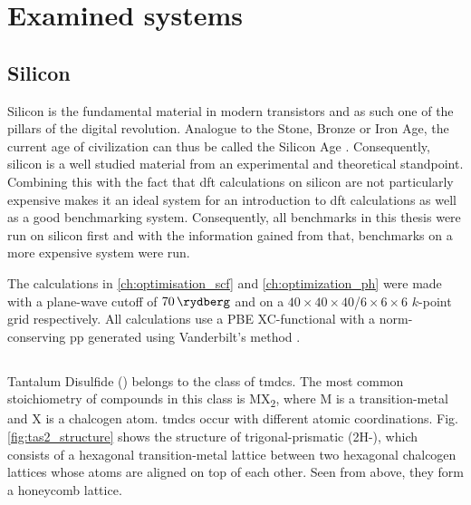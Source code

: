 \documentclass[main.tex]{subfiles}
\begin{document}
\chapter{Examined systems}\label{ch:examined_systems}

\section{Silicon}\label{sec:systems_silicon}

Silicon is the fundamental material in modern transistors and as such one of the pillars of the digital revolution.
Analogue to the Stone, Bronze or Iron Age, the current age of civilization can thus be called the Silicon Age \cite{chabal_fundamental_2001}.
Consequently, silicon is a well studied material from an experimental and theoretical standpoint.
Combining this with the fact that \acrshort{dft} calculations on silicon are not particularly expensive makes it an ideal system for an introduction to \acrshort{dft} calculations as well as a good benchmarking system.
Consequently, all benchmarks in this thesis were run on silicon first and with the information gained from that, benchmarks on a more expensive system were run.

The calculations in \cref{ch:optimisation_scf} and \ref{ch:optimization_ph} were made with a plane-wave cutoff of \(\SI{70}{\rydberg}\) and on a \(40\times40\times40\)/\(6\times6\times6\) \(k\)-point grid respectively.
All calculations use a PBE XC-functional with a norm-conserving \acrshort{pp} generated using Vanderbilt's method \cite{hamann_erratum_2017}.

\section{\TaS}\label{sec:systems_tas2}

Tantalum Disulfide (\TaS) belongs to the class of \acrfull{tmdc}s.
The most common stoichiometry of compounds in this class is MX\textsubscript{2}, where M is a transition-metal and X is a chalcogen atom.
\acrshort{tmdc}s occur with different atomic coordinations.
Fig. \ref{fig:tas2_structure} shows the structure of trigonal-prismatic \TaS (2H-\TaS), which consists of a hexagonal transition-metal lattice between two hexagonal chalcogen lattices whose atoms are aligned on top of each other.
Seen from above, they form a honeycomb lattice.
\end{document}
